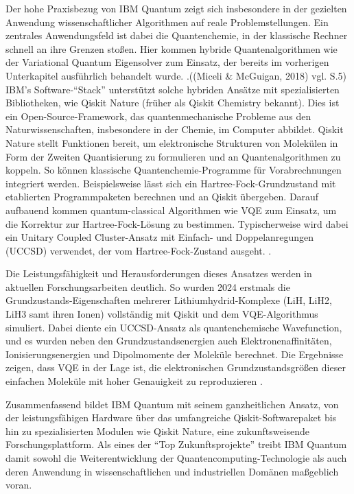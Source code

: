 Der hohe Praxisbezug von IBM Quantum zeigt sich insbesondere in der gezielten Anwendung wissenschaftlicher Algorithmen auf reale Problemstellungen. Ein zentrales Anwendungsfeld ist dabei die Quantenchemie, in der klassische Rechner schnell an ihre Grenzen stoßen. Hier kommen hybride Quantenalgorithmen wie der Variational Quantum Eigensolver zum Einsatz, der bereits im vorherigen Unterkapitel ausführlich behandelt wurde. \citealp[5]{}.((Miceli & McGuigan, 2018) vgl. S.5) IBM’s Software-“Stack” unterstützt solche hybriden Ansätze mit spezialisierten Bibliotheken, wie Qiskit Nature (früher als Qiskit Chemistry bekannt). Dies ist ein Open-Source-Framework, das quantenmechanische Probleme aus den Naturwissenschaften, insbesondere in der Chemie, im Computer abbildet. Qiskit Nature stellt Funktionen bereit, um elektronische Strukturen von Molekülen in Form der Zweiten Quantisierung zu formulieren und an Quantenalgorithmen zu koppeln. So können klassische Quantenchemie-Programme für Vorabrechnungen integriert werden. Beispielsweise lässt sich ein Hartree-Fock-Grundzustand mit etablierten Programmpaketen berechnen und an Qiskit übergeben. Darauf aufbauend kommen quantum-classical Algorithmen wie VQE zum Einsatz, um die Korrektur zur Hartree-Fock-Lösung zu bestimmen. Typischerweise wird dabei ein Unitary Coupled Cluster-Ansatz mit Einfach- und Doppelanregungen (UCCSD) verwendet, der vom Hartree-Fock-Zustand ausgeht. \citealp[2ff.]{avramidisGroundStateProperty2024}.

Die Leistungsfähigkeit und Herausforderungen dieses Ansatzes werden in aktuellen Forschungsarbeiten deutlich. So wurden 2024 erstmals die Grundzustands-Eigenschaften mehrerer Lithiumhydrid-Komplexe (LiH, LiH2, LiH3 samt ihren Ionen) vollständig mit Qiskit und dem VQE-Algorithmus simuliert. Dabei diente ein UCCSD-Ansatz als quantenchemische Wavefunction, und es wurden neben den Grundzustandsenergien auch Elektronenaffinitäten, Ionisierungsenergien und Dipolmomente der Moleküle berechnet. Die Ergebnisse zeigen, dass VQE in der Lage ist, die elektronischen Grundzustandsgrößen dieser einfachen Moleküle mit hoher Genauigkeit zu reproduzieren \citealp[4]{avramidisGroundStateProperty2024}.

Zusammenfassend bildet IBM Quantum mit seinem ganzheitlichen Ansatz, von der leistungsfähigen Hardware über das umfangreiche Qiskit-Softwarepaket bis hin zu spezialisierten Modulen wie Qiskit Nature, eine zukunftsweisende Forschungsplattform. Als eines der “Top Zukunftsprojekte” treibt IBM Quantum damit sowohl die Weiterentwicklung der Quantencomputing-Technologie als auch deren Anwendung in wissenschaftlichen und industriellen Domänen maßgeblich voran.


